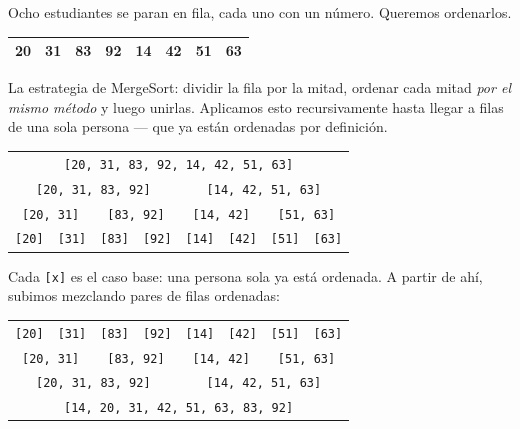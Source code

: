 \documentclass[12pt, oneside]{article}
\begin{document}
Ocho estudiantes se paran en fila, cada uno con un número. Queremos ordenarlos.

\begin{center}
\begin{tabular}{|c|c|c|c|c|c|c|c|}
\hline
20 & 31 & 83 & 92 & 14 & 42 & 51 & 63 \\
\hline
\end{tabular}
\end{center}

La estrategia de MergeSort: dividir la fila por la mitad, ordenar cada mitad
\textit{por el mismo método} y luego unirlas. Aplicamos esto recursivamente hasta
llegar a filas de una sola persona — que ya están ordenadas por definición.

\begin{center}
\begin{tabular}{cccccccc}
  \multicolumn{8}{c}{\texttt{[20, 31, 83, 92, 14, 42, 51, 63]}} \\[4pt]
  \multicolumn{4}{c}{\texttt{[20, 31, 83, 92]}} &
  \multicolumn{4}{c}{\texttt{[14, 42, 51, 63]}} \\[4pt]
  \multicolumn{2}{c}{\texttt{[20, 31]}} &
  \multicolumn{2}{c}{\texttt{[83, 92]}} &
  \multicolumn{2}{c}{\texttt{[14, 42]}} &
  \multicolumn{2}{c}{\texttt{[51, 63]}} \\[4pt]
  \texttt{[20]} & \texttt{[31]} & \texttt{[83]} & \texttt{[92]} &
  \texttt{[14]} & \texttt{[42]} & \texttt{[51]} & \texttt{[63]} \\
\end{tabular}
\end{center}

Cada \texttt{[x]} es el caso base: una persona sola ya está ordenada. A partir
de ahí, subimos mezclando pares de filas ordenadas:

\begin{center}
\begin{tabular}{cccccccc}
  \texttt{[20]} & \texttt{[31]} & \texttt{[83]} & \texttt{[92]} &
  \texttt{[14]} & \texttt{[42]} & \texttt{[51]} & \texttt{[63]} \\[4pt]
  \multicolumn{2}{c}{\texttt{[20, 31]}} &
  \multicolumn{2}{c}{\texttt{[83, 92]}} &
  \multicolumn{2}{c}{\texttt{[14, 42]}} &
  \multicolumn{2}{c}{\texttt{[51, 63]}} \\[4pt]
  \multicolumn{4}{c}{\texttt{[20, 31, 83, 92]}} &
  \multicolumn{4}{c}{\texttt{[14, 42, 51, 63]}} \\[4pt]
  \multicolumn{8}{c}{\texttt{[14, 20, 31, 42, 51, 63, 83, 92]}} \\
\end{tabular}
\end{center}
\end{document}
